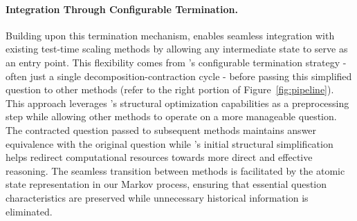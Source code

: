 \paragraph{Integration Through Configurable Termination.}
Building upon this termination mechanism, \our enables seamless integration with existing test-time scaling methods by allowing any intermediate state to serve as an entry point. This flexibility comes from \our's configurable termination strategy - often just a single decomposition-contraction cycle - before passing this simplified question to other methods (refer to the right portion of Figure~\ref{fig:pipeline}). This approach leverages \our's structural optimization capabilities as a preprocessing step while allowing other methods to operate on a more manageable question. The contracted question passed to subsequent methods maintains answer equivalence with the original question while \our's initial structural simplification helps redirect computational resources towards more direct and effective reasoning. The seamless transition between methods is facilitated by the atomic state representation in our Markov process, ensuring that essential question characteristics are preserved while unnecessary historical information is eliminated.

